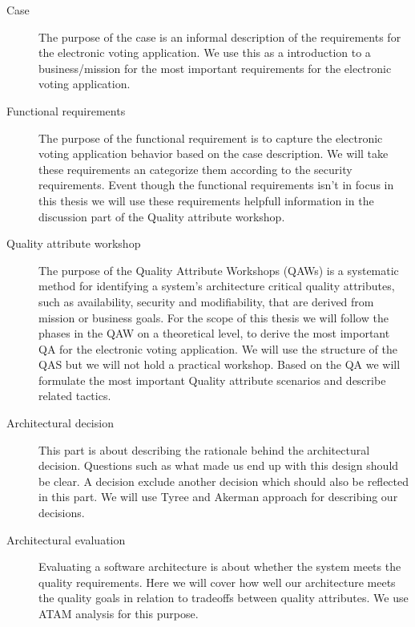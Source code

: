 \begin{description}
    \item[Case] The purpose of the case is an informal description of the requirements for the electronic voting application. We use this as a introduction to a business/mission for the most important requirements for the electronic voting application.
    
    
    \item[Functional requirements]  The purpose of the functional requirement is to capture the electronic voting application behavior based on the case description. We will take these requirements an categorize them according to the security requirements. Event though the functional requirements isn't in focus in this thesis we will use these requirements helpfull information in the discussion part of the Quality attribute workshop.  
    
    \item[Quality attribute workshop]  The purpose of the Quality Attribute Workshops (QAWs) is a systematic method for identifying a system's architecture critical quality attributes, such as availability, security and modifiability, that are derived from mission or business goals. For the scope of this thesis we will follow the phases in the QAW on a theoretical level, to derive the most important QA for the electronic voting application. We will use the structure of the QAS but we will not hold a practical workshop.  Based on the QA we will formulate the most important Quality attribute scenarios and describe related tactics.
    
    \item[Architectural decision]  This part is about describing the rationale behind the architectural decision. Questions such as what made us end up with this design should be clear. A decision exclude another decision which should also be reflected in this part. We will use Tyree and Akerman approach for describing our decisions. 
    
    \item[Architectural evaluation]  Evaluating a software architecture is about whether the system meets the quality requirements. Here we will cover how well our architecture meets the quality goals in relation to tradeoffs between quality attributes. We use ATAM analysis for this purpose.  

\end{description}